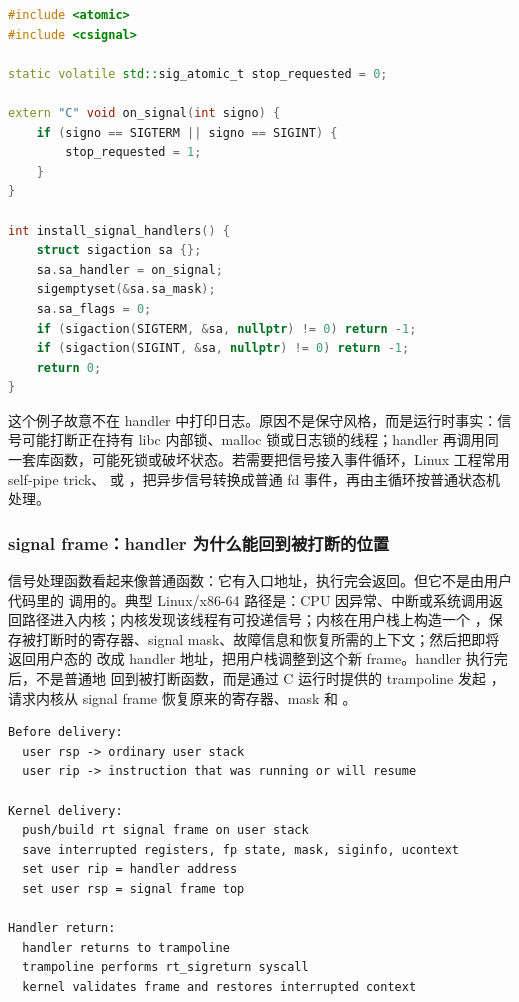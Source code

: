 \begin{lstlisting}[language=C++,caption={signal handler 只做最小动作}]
#include <atomic>
#include <csignal>

static volatile std::sig_atomic_t stop_requested = 0;

extern "C" void on_signal(int signo) {
    if (signo == SIGTERM || signo == SIGINT) {
        stop_requested = 1;
    }
}

int install_signal_handlers() {
    struct sigaction sa {};
    sa.sa_handler = on_signal;
    sigemptyset(&sa.sa_mask);
    sa.sa_flags = 0;
    if (sigaction(SIGTERM, &sa, nullptr) != 0) return -1;
    if (sigaction(SIGINT, &sa, nullptr) != 0) return -1;
    return 0;
}
\end{lstlisting}

这个例子故意不在 handler 中打印日志。原因不是保守风格，而是运行时事实：信号可能打断正在持有 libc 内部锁、malloc 锁或日志锁的线程；handler 再调用同一套库函数，可能死锁或破坏状态。若需要把信号接入事件循环，Linux 工程常用 self-pipe trick、 或 ，把异步信号转换成普通 fd 事件，再由主循环按普通状态机处理。

\subsubsection{signal frame：handler 为什么能回到被打断的位置}

信号处理函数看起来像普通函数：它有入口地址，执行完会返回。但它不是由用户代码里的  调用的。典型 Linux/x86-64 路径是：CPU 因异常、中断或系统调用返回路径进入内核；内核发现该线程有可投递信号；内核在用户栈上构造一个 ，保存被打断时的寄存器、signal mask、故障信息和恢复所需的上下文；然后把即将返回用户态的  改成 handler 地址，把用户栈调整到这个新 frame。handler 执行完后，不是普通地  回到被打断函数，而是通过 C 运行时提供的 trampoline 发起 ，请求内核从 signal frame 恢复原来的寄存器、mask 和 。

\begin{lstlisting}[numbers=none,caption={signal delivery 的用户栈视角}]
Before delivery:
  user rsp -> ordinary user stack
  user rip -> instruction that was running or will resume

Kernel delivery:
  push/build rt signal frame on user stack
  save interrupted registers, fp state, mask, siginfo, ucontext
  set user rip = handler address
  set user rsp = signal frame top

Handler return:
  handler returns to trampoline
  trampoline performs rt_sigreturn syscall
  kernel validates frame and restores interrupted context
\end{lstlisting}


